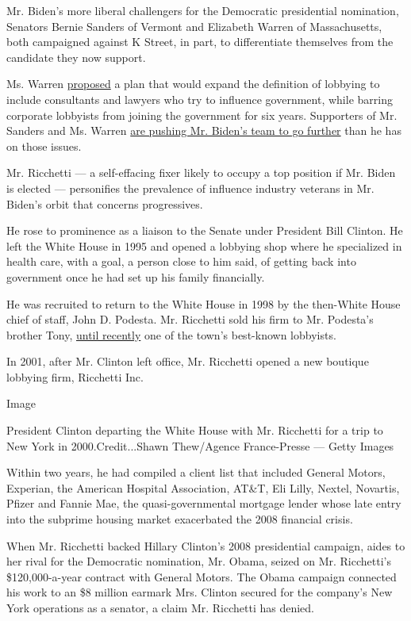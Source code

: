 Mr. Biden's more liberal challengers for the Democratic presidential
nomination, Senators Bernie Sanders of Vermont and Elizabeth Warren of
Massachusetts, both campaigned against K Street, in part, to
differentiate themselves from the candidate they now support.

Ms. Warren
\href{https://medium.com/@teamwarren/my-plan-to-end-washington-corruption-554c7f01aaa5}{proposed}
a plan that would expand the definition of lobbying to include
consultants and lawyers who try to influence government, while barring
corporate lobbyists from joining the government for six years.
Supporters of Mr. Sanders and Ms. Warren
\href{https://www.politico.com/news/2020/07/30/joe-biden-bernie-sanders-convention-389226}{are
pushing Mr. Biden's team to go further} than he has on those issues.

Mr. Ricchetti --- a self-effacing fixer likely to occupy a top position
if Mr. Biden is elected --- personifies the prevalence of influence
industry veterans in Mr. Biden's orbit that concerns progressives.

He rose to prominence as a liaison to the Senate under President Bill
Clinton. He left the White House in 1995 and opened a lobbying shop
where he specialized in health care, with a goal, a person close to him
said, of getting back into government once he had set up his family
financially.

He was recruited to return to the White House in 1998 by the then-White
House chief of staff, John D. Podesta. Mr. Ricchetti sold his firm to
Mr. Podesta's brother Tony,
\href{https://www.nytimes3xbfgragh.onion/2017/11/10/us/politics/john-tony-podesta-mueller-russia-investigation.html}{until
recently} one of the town's best-known lobbyists.

In 2001, after Mr. Clinton left office, Mr. Ricchetti opened a new
boutique lobbying firm, Ricchetti Inc.

Image

President Clinton departing the White House with Mr. Ricchetti for a
trip to New York in 2000.Credit...Shawn Thew/Agence France-Presse ---
Getty Images

Within two years, he had compiled a client list that included General
Motors, Experian, the American Hospital Association, AT\&T, Eli Lilly,
Nextel, Novartis, Pfizer and Fannie Mae, the quasi-governmental mortgage
lender whose late entry into the subprime housing market exacerbated the
2008 financial crisis.

When Mr. Ricchetti backed Hillary Clinton's 2008 presidential campaign,
aides to her rival for the Democratic nomination, Mr. Obama, seized on
Mr. Ricchetti's \$120,000-a-year contract with General Motors. The Obama
campaign connected his work to an \$8 million earmark Mrs. Clinton
secured for the company's New York operations as a senator, a claim Mr.
Ricchetti has denied.


